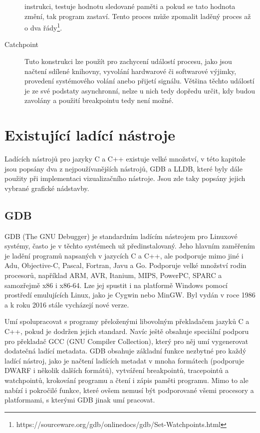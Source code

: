 \documentclass[bc,male,python,dept460]{diploma}						%
\begin{document}
\begin{description}
				instrukci, testuje hodnotu sledované paměti a pokud se tato hodnota změní, tak program zastaví. Tento proces může zpomalit laděný proces až o
				dva řády\footnote{https://sourceware.org/gdb/onlinedocs/gdb/Set-Watchpoints.html}.
			\item[Catchpoint]
				Tuto konstrukci lze použít pro zachycení událostí procesu, jako jsou načtení sdílené knihovny, vyvolání hardwarové či softwarové výjimky, provedení
				systémového volání anebo přijetí signálu. Většina těchto událostí je ze své podstaty asynchronní, nelze u nich tedy dopředu určit, kdy budou zavolány
				a použití breakpointu tedy není možné.
		\end{description}
		
\section {Existující ladící nástroje}
	Ladících nástrojů pro jazyky C a C++ existuje velké množství, v této kapitole jsou popsány dva z nejpoužívanějších nástrojů, GDB a LLDB, které byly dále
	použity při implementaci vizualizačního nástroje. Jsou zde taky popsány jejich vybrané grafické nádstavby.

	\subsection{GDB}
		GDB (The GNU Debugger) je standardním ladícím nástrojem pro Linuxové systémy, často je v těchto systémech už předinstalovaný.
		Jeho hlavním zaměřením je ladění programů napsaných v jazycích C a C++, ale podporuje mimo jiné i Adu, Objective-C, Pascal, Fortran, Javu
		a Go\cite{gdb-languages}. Podporuje velké množství rodin procesorů, například ARM, AVR, Itanium, MIPS, PowerPC, SPARC a samozřejmě x86 i x86-64.
		Lze jej spustit i na platformě Windows pomocí prostředí emulujících Linux, jako je Cygwin nebo MinGW. Byl vydán v roce 1986 a k roku
		2016 stále vycházejí nové verze.
		
		\par Umí spolupracovat s programy přeloženými libovolným překladačem jazyků C a C++, pokud je dodržen jejich standard. Navíc ještě obsahuje
		speciální podporu pro překladač GCC (GNU Compiler Collection), který pro něj umí vygenerovat dodatečná ladící metadata.
		GDB obsahuje základní funkce nezbytné pro každý ladící nástroj, jako je načtení ladících metadat v mnoha formátech (podporuje DWARF i několik dalších
		formátů), vytváření breakpointů, tracepointů a watchpointů, krokování programu a čtení i zápis paměti programu.
		Mimo to ale nabízí i pokročilé funkce, které ovšem nemusí být podporované všemi procesory a platformami, s kterými GDB jinak umí pracovat.
		
\end{document}
